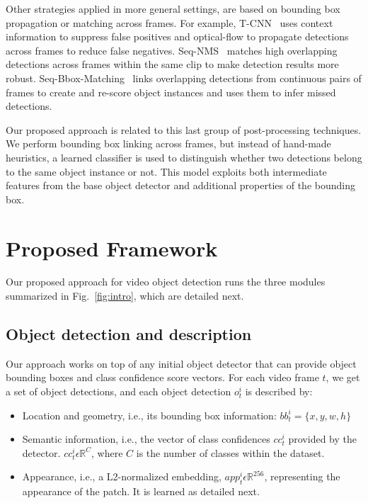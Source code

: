\documentclass[letterpaper, 10 pt, conference]{ieeeconf}
\begin{document}
Other strategies applied in more general settings, are based on bounding box propagation or matching across frames. For example, T-CNN~\cite{TCNN} uses context information to suppress false positives and optical-flow to propagate detections across frames to reduce false negatives. 
Seq-NMS~\cite{SEQ-NMS} matches high overlapping detections across frames within the same clip to make detection results more robust. 
Seq-Bbox-Matching~\cite{SEQ-BBOX:VISIGRAPP} links overlapping detections from continuous pairs of frames to create and re-score object instances and uses them to infer missed detections.


Our proposed approach is related to this last group of post-processing techniques. We perform bounding box linking across frames, but instead of hand-made heuristics, a learned classifier is used to distinguish whether two detections belong to the same object instance or not. This model exploits both intermediate features from the base object detector and additional properties of the bounding box. 




\section{Proposed Framework}




















Our proposed approach for video object detection runs the three modules summarized in Fig.~\ref{fig:intro}, which are detailed next.

\subsection{Object detection and description}
\label{sec:det_and_descr}


Our approach works on top of any initial object detector that can provide object bounding boxes and class confidence score vectors. For each video frame $t$, we get a set of object detections, 
and each object detection $o^i_{t}$ is described by:
\begin{itemize}
    \item Location and geometry, i.e., its bounding box information: $bb^i_{t} = \{x, y, w, h \}$


    \item Semantic information, i.e., the vector of class confidences $cc^i_{t}$ provided by the detector. $cc^i_{t} \epsilon \mathbb{R}^C$, where $C$ is the number of classes within the dataset.

    \item Appearance, i.e., a L2-normalized embedding, $app^i_{t}\epsilon\mathbb{R}^{256}$, representing the appearance of the patch. It is learned as detailed next. 
\end{itemize}
\end{document}
